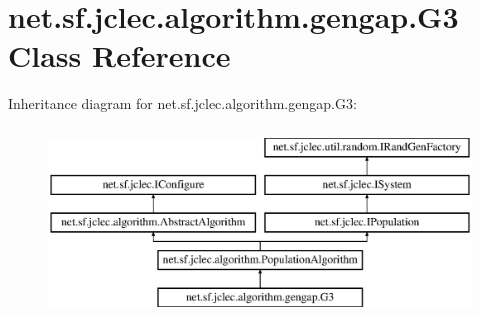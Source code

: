 \hypertarget{classnet_1_1sf_1_1jclec_1_1algorithm_1_1gengap_1_1_g3}{\section{net.\-sf.\-jclec.\-algorithm.\-gengap.\-G3 Class Reference}
\label{classnet_1_1sf_1_1jclec_1_1algorithm_1_1gengap_1_1_g3}
}
Inheritance diagram for net.\-sf.\-jclec.\-algorithm.\-gengap.\-G3\-:\begin{figure}[H]
\begin{center}
\leavevmode
\includegraphics[height=5.000000cm]{classnet_1_1sf_1_1jclec_1_1algorithm_1_1gengap_1_1_g3}
\end{center}
\end{figure}

